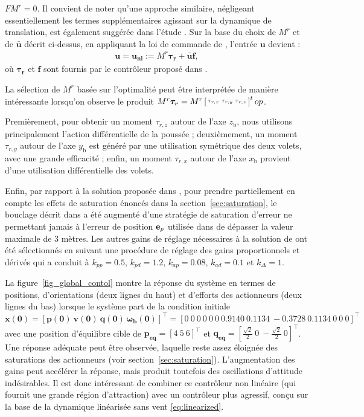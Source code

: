 $FM^r=0$. Il convient de noter qu'une approche similaire, négligeant essentiellement les termes supplémentaires agissant sur la dynamique de translation, est également suggérée dans l'étude \cite{hamel_minhduc}. 
Sur la base du choix de $M^r$ et de $\boldsymbol{\bar u}$ décrit ci-dessus, en appliquant la loi de commande de \cite[eqn (19)]{2020e-MicCenZacFra}, l'entrée $\boldsymbol{u}$ devient :
\begin{align}
\label{eq:u_nonlin}
    \boldsymbol{u} = \boldsymbol{u_{\text{nl}}} := M^r \boldsymbol{\tau_{r}} + \boldsymbol{\bar u} \boldsymbol{f},
\end{align}
où $\boldsymbol{\tau_{r}}$ et $\boldsymbol{f}$ sont fournis par le contrôleur proposé dans \cite{2020e-MicCenZacFra}.


La sélection de $M^r$ basée sur l'optimalité peut être interprétée de manière intéressante lorsqu'on observe le produit $M^r \boldsymbol{\tau_{r}} = M^r \left[ \begin{smallmatrix}\tau_{r,x} & \tau_{r,y} & \tau_{r,z} \end{smallmatrix} \right]^top$. 

Premièrement, pour obtenir un moment $\tau_{r,z}$ autour de l'axe $z_{\text{b}}$, nous utilisons principalement l'action différentielle de la poussée ; deuxièmement, un moment $\tau_{r,y}$ autour de l'axe $y_{\text{b}}$ est généré par une utilisation symétrique des deux volets, avec une grande efficacité ; enfin, un moment $\tau_{r,x}$ autour de l'axe $x_{\text{b}}$ provient d'une utilisation différentielle des volets. 

Enfin, par rapport à la solution proposée dans \cite{2020e-MicCenZacFra}, pour prendre partiellement en compte les effets de saturation énoncés dans la section~\ref{sec:saturation}, le bouclage décrit dans \cite{2020e-MicCenZacFra} a été augmenté d'une stratégie de saturation d'erreur ne permettant jamais à l'erreur de position $\boldsymbol{\rm e}_p$ utilisée dans \cite[eqn. (22)]{2020e-MicCenZacFra} de dépasser la valeur maximale de 3 mètres. Les autres gains de réglage nécessaires à la solution de \cite{2020e-MicCenZacFra} ont été sélectionnés
en suivant une procédure de réglage des gains proportionnels et dérivés qui a conduit à $k_{pp} = 0.5$, $k_{pd} = 1.2$, $k_{ap} = 0.08$, $k_{ad} = 0.1$ et $k_{\Delta} = 1$.
 
La figure~\ref{fig_global_contol} montre la réponse du système en termes de positions, d'orientations (deux lignes du haut) et d'efforts des actionneurs (deux lignes du bas) lorsque le système part de la condition initiale $\boldsymbol{x(0)} = [\boldsymbol{p(0)}~ \boldsymbol{v(0)}~ \boldsymbol{q(0)}~ \boldsymbol{\omega_b(0)}]^\top = [0~0~0 ~ 0~0~0 ~0. 9140 ~0.1134~ -0.3728~ 0. 1134~ 0~ 0~ 0]^\top $ avec une position d'équilibre cible de $\boldsymbol{p_{\text{eq}}} = [4~5~6]^\top$ et $\boldsymbol{q_{\text{eq}}} = [\frac{\sqrt{2}}{2}~0~-\frac{\sqrt{2}}{2}~0]^\top$. 
Une réponse adéquate peut être observée, laquelle reste assez éloignée des saturations des actionneurs (voir section~\ref{sec:saturation}). L'augmentation des gains peut accélérer la réponse, mais produit toutefois des oscillations d'attitude indésirables. Il est donc intéressant de combiner ce contrôleur non linéaire (qui fournit une grande région d'attraction) avec un contrôleur plus agressif, conçu sur la base de la dynamique linéarisée sans vent \eqref{eq:linearized}.


